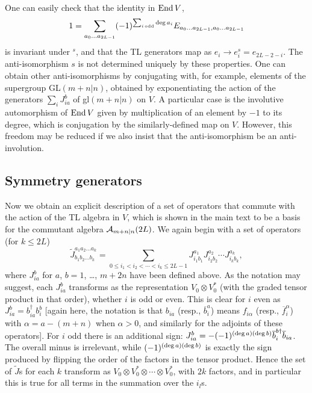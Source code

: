 \documentclass[twocolumn,floats,pra]{revtex4}
\def \cA {{\cal A}}
\newcommand {\be}{\begin{equation}}
\newcommand {\ee} {\end{equation}}
\begin{document}
One can easily check that the identity in ${\rm End}\, V$,%
\be%
1=\sum_{a_0\ldots a_{2L-1}}(-1)^{\sum_{i\,\rm odd}{\rm deg}\,
a_i}E_{a_0\ldots a_{2L-1},a_0\ldots a_{2L-1}}\ee%
is invariant under $^s$, and that the TL generators map as $e_i\to
e_i^s=e_{2L-2-i}$. The anti-isomorphism $s$ is not determined
uniquely by these properties. One can obtain other
anti-isomorphisms by conjugating with, for example, elements of
the supergroup GL$(m+n|n)$, obtained by exponentiating the action
of the generators $\sum_i J_{ia}^b$ of gl$(m+n|n)$ on $V$. A
particular case is the involutive automorphism of ${\rm End}\, V$
given by multiplication of an element by $-1$ to its degree, which
is conjugation by the similarly-defined map on $V$. However, this
freedom may be reduced if we also insist that the anti-isomorphism
be an anti-involution.

\subsection{Symmetry generators}


Now we obtain an explicit description of a set of operators that
commute with the action of the TL algebra in $V$, which is shown
in the main text to be a basis for the commutant algebra
$\cA_{m+n|n}(2L)$. We again begin with a set of operators (for $k\leq 2L$)%
\be%
\widetilde{J}^{a_1a_2\ldots a_k}_{b_1b_2\ldots b_k}=\sum_{0\leq
i_1<i_2<\cdots <i_k\leq 2L-1} J_{i_1 b_1}^{a_1}J_{i_2
b_2}^{a_2}\cdots J_{i_k b_k}^{a_k}, \ee%
where $J_{ia}^b$ for $a$, $b=1$, \ldots, $m+2n$ have been defined
above. As the notation may suggest, each $J_{ia}^b$ transforms as
the representation $V_0\otimes V_0^*$ (with the graded tensor
product in that order), whether $i$ is odd or even. This is clear
for $i$ even as $J_{ia}^b=b_{ia}^\dagger b_i^b$ [again here, the
notation is that $b_{ia}$ (resp., $\overline{b}_i^a$) means
$f_{i\alpha}$ (resp., $\overline{f}_i^\alpha$) with
$\alpha=a-(m+n)$ when $\alpha>0$, and similarly for the adjoints
of these operators]. For $i$ odd there is an additional sign:
$J_{ia}^b=-(-1)^{({\rm deg}\,a)({\rm deg}\,
b)}\overline{b}_i^{b\dagger}\overline{b}_{ia}$. The overall minus
is irrelevant, while $(-1)^{({\rm deg}\,a)({\rm deg}\, b)}$ is
exactly the sign produced by flipping the order of the factors in
the tensor product. Hence the set of $\widetilde{J}$s for each $k$
transform as $V_0\otimes V_0^*\otimes\cdots\otimes V_0^*$, with
$2k$ factors, and in particular this is true for all terms in the
summation over the $i_l$s.
\end{document}
